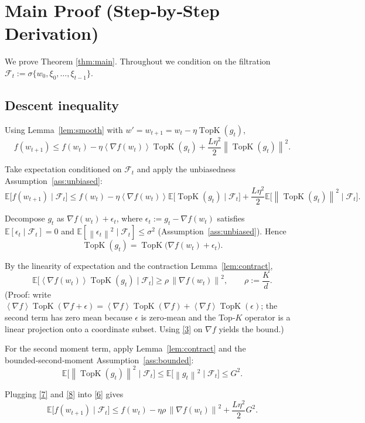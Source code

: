 \documentclass{article}
\newcommand{\E}{\mathbb{E}}
\newcommand{\norm}[1]{\left\|#1\right\|}
\newcommand{\inner}[1]{\left\langle #1 \right\rangle}
\newcommand{\TopK}{\operatorname{TopK}}
\begin{document}
\section*{Main Proof (Step‑by‑Step Derivation)}
We prove Theorem \ref{thm:main}.  Throughout we condition on the filtration
$\mathcal{F}_t:=\sigma\{w_0,\xi_0,\dots,\xi_{t-1}\}$.

\subsection*{Descent inequality}
\begin{enumerate}[label={[\arabic*]}]
\item Using Lemma~\ref{lem:smooth} with $w'=w_{t+1}=w_t-\eta\TopK(g_t)$,
\[
f(w_{t+1})\le f(w_t)-\eta\inner{\nabla f(w_t)}{\TopK(g_t)}
+\frac{L\eta^{2}}{2}\norm{\TopK(g_t)}^{2}. \tag{5}
\]
\item Take expectation conditioned on $\mathcal{F}_t$ and apply the unbiasedness
Assumption~\ref{ass:unbiased}:
\[
\E\!\bigl[f(w_{t+1})\mid\mathcal{F}_t\bigr]
\le f(w_t)-\eta\inner{\nabla f(w_t)}{\E\!\bigl[\TopK(g_t)\mid\mathcal{F}_t\bigr]}
+\frac{L\eta^{2}}{2}\E\!\bigl[\norm{\TopK(g_t)}^{2}\mid\mathcal{F}_t\bigr].
\tag{6}
\]
\item Decompose $g_t$ as $\nabla f(w_t)+\epsilon_t$, where $\epsilon_t:=g_t-\nabla f(w_t)$ satisfies 
$\E[\epsilon_t\mid\mathcal{F}_t]=0$ and $\E[\norm{\epsilon_t}^{2}\mid\mathcal{F}_t]\le\sigma^{2}$ (Assumption~\ref{ass:unbiased}).
Hence
\[
\TopK(g_t)=\TopK\!\bigl(\nabla f(w_t)+\epsilon_t\bigr).
\]
\item By the linearity of expectation and the contraction Lemma~\ref{lem:contract},
\[
\E\!\bigl[\inner{\nabla f(w_t)}{\TopK(g_t)}\mid\mathcal{F}_t\bigr]
\ge \rho\,\norm{\nabla f(w_t)}^{2},\qquad 
\rho:=\frac{K}{d}.
\tag{7}
\]
(Proof: write $\inner{\nabla f}{\TopK(\nabla f+\epsilon)}=
\inner{\nabla f}{\TopK(\nabla f)}+\inner{\nabla f}{\TopK(\epsilon)}$; the second term has zero mean because $\epsilon$ is zero‑mean and the Top‑$K$ operator is a linear projection onto a coordinate subset.  Using \eqref{3} on $\nabla f$ yields the bound.) 

\item For the second moment term, apply Lemma~\ref{lem:contract} and the bounded‑second‑moment Assumption~\ref{ass:bounded}:
\[
\E\!\bigl[\norm{\TopK(g_t)}^{2}\mid\mathcal{F}_t\bigr]
\le \E\!\bigl[\norm{g_t}^{2}\mid\mathcal{F}_t\bigr]
\le G^{2}. \tag{8}
\]

\item Plugging \eqref{7} and \eqref{8} into \eqref{6} gives
\[
\E\!\bigl[f(w_{t+1})\mid\mathcal{F}_t\bigr]
\le f(w_t)-\eta\rho\,\norm{\nabla f(w_t)}^{2}
+\frac{L\eta^{2}}{2}G^{2}. \tag{9}
\]


\end{enumerate}
\end{document}
